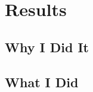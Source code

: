 
\chapter{Results}
\label{cha:results}

\section{Why I Did It}
\label{sec:why2}

\section{What I Did}
\label{sec:what2}

